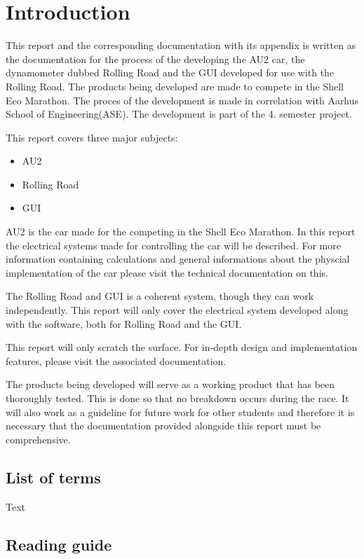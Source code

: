 \chapter{Introduction}
This report and the corresponding documentation with its appendix is written as the documentation for the process of the developing the AU2 car, the dynamometer dubbed Rolling Road and the GUI developed for use with the Rolling Road. The products being developed are made to compete in the Shell Eco Marathon. The proces of the development is made in correlation with Aarhus School of Engineering(ASE). The development is part of the 4. semester project. 

This report covers three major subjects:

\begin{itemize}
	\item{AU2}
	\item{Rolling Road}
	\item{GUI}
\end{itemize}

AU2 is the car made for the competing in the Shell Eco Marathon. In this report the electrical systems made for controlling the car will be described. For more information containing calculations and general informations about the physcial implementation of the car please visit the technical documentation on this.

The Rolling Road and GUI is a coherent system, though they can work independently. This report will only cover the electrical system developed along with the software, both for Rolling Road and the GUI. 

This report will only scratch the surface. For in-depth design and implementation features, please visit the associated documentation. 

The products being developed will serve as a working product that has been thoroughly tested. This is done so that no breakdown occurs during the race. It will also work as a guideline for future work for other students and therefore it is necessary that the documentation provided alongside this report must be comprehensive.

\section{List of terms}
Text


\section{Reading guide}

